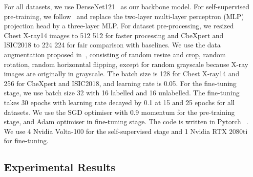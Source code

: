 \documentclass[runningheads]{llncs}
\begin{document}
For all datasets, we use DenseNet121~\cite{huang2017densely} as our backbone model. For self-supervised pre-training, we follow~\cite{chen2020big} and replace the two-layer multi-layer perceptron (MLP) projection head by a three-layer MLP.
For dataset pre-processing, we resized Chest X-ray14 images to 512  512 for faster processing and CheXpert and ISIC2018 to 224  224 for fair comparison with baselines. 
We use the data augmentation proposed in~\cite{simclr}, consisting of random resize and crop, random rotation, random horizonntal flipping, except for random grayscale because X-ray images are originally in grayscale.
The batch size is 128 for Chest X-ray14 and 256 for CheXpert and ISIC2018, and learning rate is 0.05. For the fine-tuning stage, we use batch size 32 with 16 labelled and 16 unlabelled. The fine-tuning takes 30 epochs with learning rate decayed by 0.1 at 15 and 25 epochs for all datasets. We use the SGD optimiser with 0.9 momentum for the pre-training stage, and Adam optimiser in fine-tuning stage. The code is written in Pytorch ~\cite{paszke2019pytorch}. 
We use 4 Nvidia Volta-100 for the self-supervised stage and 1 Nvidia RTX 2080ti for fine-tuning.






\vspace{-.2in}
\subsection{Experimental Results}
\end{document}
